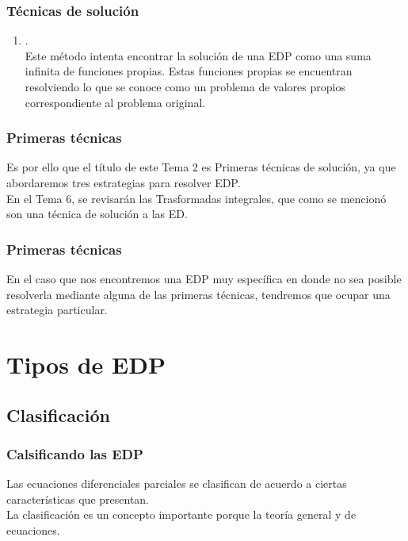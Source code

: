 \documentclass[12pt]{beamer}
\begin{document}
\begin{frame}
\frametitle{Técnicas de solución}
\begin{enumerate}
\conti
\item {}.
\\
\bigskip
Este método intenta encontrar la solución de una EDP como una suma infinita de funciones propias. Estas funciones propias se encuentran resolviendo lo que se conoce como un problema de valores propios correspondiente al problema original.
\end{enumerate}
\end{frame}
\begin{frame}
\frametitle{Primeras técnicas}
Es por ello que el título de este Tema 2 es Primeras técnicas de solución, ya que abordaremos tres estrategias para resolver EDP.
\\
\bigskip
\pause
En el Tema 6, se revisarán las Trasformadas integrales, que como se mencionó son una técnica de solución a las ED.
\end{frame}
\begin{frame}
\frametitle{Primeras técnicas}
En el caso que nos encontremos una EDP muy específica en donde no sea posible resolverla mediante alguna de las primeras técnicas, tendremos que ocupar una estrategia particular.
\end{frame}

\section{Tipos de EDP}
\subsection{Clasificación}

\begin{frame}
\frametitle{Calsificando las EDP}
Las ecuaciones diferenciales parciales se clasifican de acuerdo a ciertas características que presentan.
\\
\bigskip
\pause
La clasificación es un concepto importante porque la teoría general y  de ecuaciones.
\end{frame}
\end{document}
